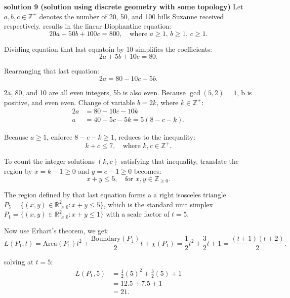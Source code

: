 \begin{enumerate}
 \textbf{solution 9 (solution using discrete geometry with some topology)} Let $a, b, c \in \mathbb{Z}^{+}$ denotes the number of 20, 50, and 100 bills Suzanne received respectively. results in the linear Diophantine equation:\begin{equation}20a + 50b + 100c = 800, \quad \text{where } a \ge 1, \, b \ge 1, \, c \ge 1.\end{equation}

 Dividing equation that last equatoin by 10 simplifies the coefficients:\begin{equation}2a + 5b + 10c = 80.\end{equation}

 Rearranging that last equation:\begin{equation}2a = 80 - 10c - 5b.\end{equation}

 2a, 80, and 10 are all even integers, 5b is also even. Because $\gcd(5, 2) = 1$, b is positive, and even even.  Change of variable $b = 2k$, where $k \in \mathbb{Z}^{+}$:\begin{align*}2a &= 80 - 10c - 10k \\a &= 40 - 5c - 5k = 5(8 - c - k).\end{align*}


 Because $a \ge 1$, enforce $8 - c - k \ge 1$, reduces to the inequality:\begin{equation}k + c \le 7, \quad \text{where } k, c \in \mathbb{Z}^{+}.\end{equation}

 To count the integer solutions $(k, c)$ satisfying that inequality, translate the region by $x = k - 1 \ge 0$ and $y = c - 1 \ge 0$ becomes:\begin{equation}x + y \le 5, \quad \text{for } x, y \in \mathbb{Z}_{\ge 0}.\end{equation}

 The region defined by that last equation forms a a right isosceles triangle $P_5 = \{ (x, y) \in \mathbb{R}_{\ge 0}^2 : x + y \le 5 \}$, which is the standard unit simplex $P_1 = \{ (x, y) \in \mathbb{R}_{\ge 0}^2 : x + y \le 1 \}$ with a scale factor of $t = 5$.

 Now use Erhart's theorem, we get:\begin{equation}L(P_1, t) = \text{Area}(P_1) t^2 + \frac{\text{Boundary}(P_1)}{2} t + \chi(P_1) = \frac{1}{2}t^2 + \frac{3}{2}t + 1 = \frac{(t+1)(t+2)}{2}.\end{equation}

 solving at $t = 5$:\begin{align*}L(P_1, 5) &= \frac{1}{2}(5)^2 + \frac{3}{2}(5) + 1 \\&= 12.5 + 7.5 + 1 \\&= 21.\end{align*}



\end{enumerate}

